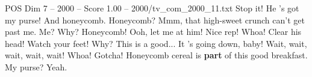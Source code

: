 \begin{textsample}{POS Dim 7 – 2000 – Score 1.00 – 2000/tv\_com\_2000\_11.txt}  \label{ex:f7_pos_059}
Stop it!
He 's got my purse!
And honeycomb.
Honeycomb?
Mmm, that high-sweet crunch can't get past me.
Me?
Why?
Honeycomb!
Ooh, let me at him!
Nice rep!
Whoa!
Clear his head!
Watch your feet!
Why?
This is a good...
It 's going down, baby!
Wait, wait, wait, wait, wait!
Whoa!
Gotcha!
Honeycomb cereal is \textbf{part} of this good breakfast.
My purse?
Yeah.

\end{textsample}
